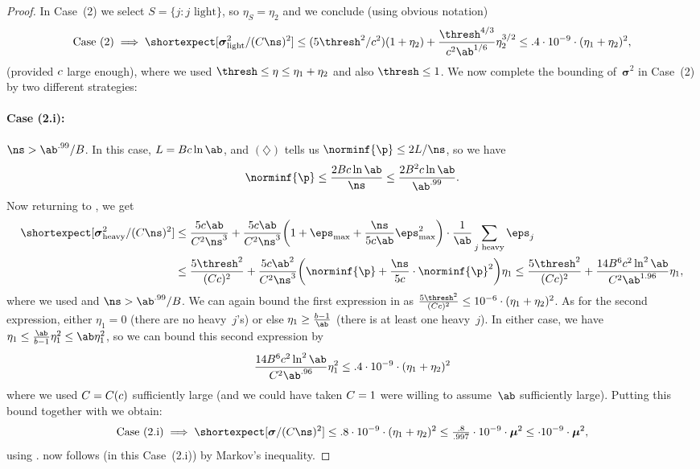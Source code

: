 \documentclass[11pt]{article}
\DeclarePairedDelimiter\parens{\lparen}{\rparen}
\newcommand{\E}{\shortexpect}
\newcommand{\bmu}{\boldsymbol{\mu}}
\newcommand{\bsigma}{\boldsymbol{\sigma}}
\begin{document}
\begin{proof}
	In Case~(2) we select $S  = \{j : j \text{ light}\}$, so $\eta_S = \eta_2$ and we conclude (using obvious notation)
	\begin{equation} \label{ineq:put}
		\text{Case (2)} \implies \E[\bsigma_{\text{light}}^2/(\cq\ns)^2] \leq (5\thresh^2/\cc^2)(1+\eta_2)+\frac{\thresh^{4/3}}{\cc^2 \ab^{1/6}}  \eta_2^{3/2}
		\leq .4 \cdot 10^{-9} \cdot (\eta_1+\eta_2)^2,
	\end{equation}
	(provided $c$ large enough), 
	where we used $\thresh \leq \eta \leq \eta_1 + \eta_2$ and also $\thresh \leq 1$.
	We now complete the bounding of~$\bsigma^2$ in Case~(2) by two different strategies:

	\paragraph{Case (2.i):} $\ns > \ab^{.99}/B$. \quad In this case, $L = B\cc \ln \ab$, and $(\diamondsuit)$ tells us $\norminf{\p} \leq 2L/\ns$, so we have
    \begin{equation}    \label{ineq:pinf}
        \norminf{\p} \leq \frac{2B\cc \ln \ab}{\ns} \leq \frac{2B^2 \cc \ln \ab}{\ab^{.99}}.
    \end{equation}
    Now returning to , we get
	\begin{align}
		\E[\bsigma_{\text{heavy}}^2/(\cq\ns)^2] &\leq \frac{5\cc\ab}{\cq^2\ns^3} + \frac{5\cc\ab}{\cq^2\ns^3}\parens*{1 +  \eps_{\text{max}} + \frac{\ns}{5\cc\ab}\eps_{\text{max}}^2} \cdot \frac{1}{\ab}\sum_{j \text{ heavy}}\eps_j\\
		&\leq \frac{5\thresh^2}{(\cq\cc)^2}  + \frac{5\cc\ab^2}{\cq^2\ns^3}\parens*{\norminf{\p} + \frac{\ns}{5 \cc} \cdot \norminf{\p}^2}\eta_1
        \leq \frac{5\thresh^2}{(\cq\cc)^2}  + \frac{14B^6\cc^2 \ln^2 \ab}{\cq^2 \ab^{1.96}}\eta_1, \label{ineq:12}
	\end{align}
    where we used  and $\ns > \ab^{.99}/B$.
	We can again bound the first expression in  as $\frac{5\thresh^2}{(\cq \cc)^2} \leq 10^{-6} \cdot (\eta_1 + \eta_2)^2$.
	As for the second expression, either $\eta_1 =0$ (there are no heavy~$j$'s) or else $\eta_1 \geq \frac{b-1}{\ab}$ (there is at least one heavy~$j$). 
	In either case, we have $\eta_1 \leq  \frac{\ab}{b-1}\eta_1^2 \leq \ab \eta_1^2$, so we can bound this second expression  by
	\begin{equation}
		\frac{14B^6\cc^2 \ln^2 \ab}{\cq^2 \ab^{.96}}\eta_1^2
        \leq .4 \cdot 10^{-9} \cdot (\eta_1 + \eta_2)^2
	\end{equation}
    where we used $C = C(c)$ sufficiently large (and we could have taken $C = 1$ were willing to assume~$\ab$ sufficiently large).
	Putting this bound together with  we obtain:
	\begin{equation}
		\text{Case~(2.i)} \implies \E[\bsigma/(\cq\ns)^2] \leq .8\cdot 10^{-9}\cdot (\eta_1+\eta_2)^2 \leq \tfrac{.8}{.997} \cdot 10^{-9} \cdot \bmu^2 \leq \cdot 10^{-9} \cdot \bmu^2,
	\end{equation}
    using .   now follows (in this Case~(2.i)) by Markov's inequality.


\end{proof}
\end{document}
